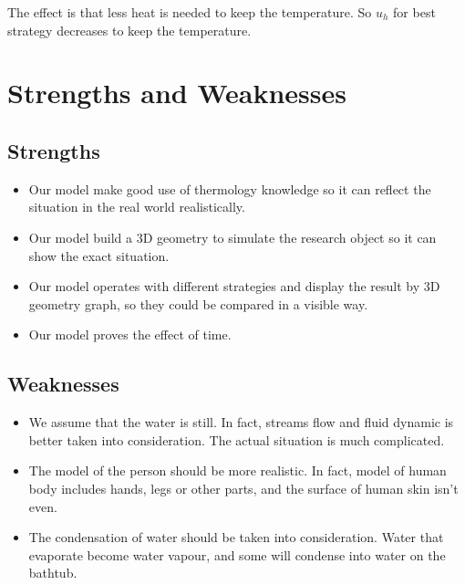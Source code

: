\documentclass[12pt,a4paper,titlepage]{article}
\begin{document}
The effect is that less heat is needed to keep the temperature. So $u_h$ for best strategy decreases to keep the temperature.

\section{Strengths and Weaknesses}
\label{sec:strengths-and-weaknesses}

\subsection*{Strengths}
\label{sec:strengths}

\begin{itemize}
\item Our model make good use of thermology knowledge so it can reflect the situation in the real world realistically.
\item Our model build a 3D geometry to simulate the research object so it can show the exact situation.
\item Our model operates with different strategies and display the result by 3D geometry graph, so they could be compared in a visible way.
\item Our model proves the effect of time.
\end{itemize}

\subsection*{Weaknesses}
\label{sec:weaknesses}

\begin{itemize}
\item We assume that the water is still. In fact, streams flow and fluid dynamic is better taken into consideration. The actual situation is much complicated.
\item The model of the person should be more realistic. In fact, model of human body includes hands, legs or other parts, and the surface of human skin isn't even.
\item The condensation of water should be taken into consideration. Water that evaporate become water vapour, and some will condense into water on the bathtub.
\end{itemize}
\end{document}
